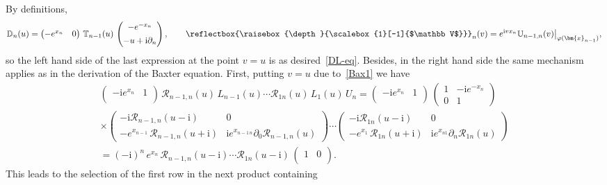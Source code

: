 \documentclass[11pt]{article}
\numberwithin{equation}{section}
\theoremstyle{plain}
\theoremstyle{definition}
\newcommand{\bbLambda}{\reflectbox{\raisebox{\depth}{\scalebox{1}[-1]{$\mathbb V$}}}}
\newcommand{\T}{\mathbb{T}}
\newcommand{\D}{\mathbb{D}}
\newcommand{\LLambda}{\bbLambda}
\newcommand{\MMO}{\mathbb{U}}
\renewcommand{\phi}{\varphi}
\renewcommand{\imath}{\mathrm{i}}
\begin{document}
By definitions, 
\begin{align}
	\D_n(u) = \begin{pmatrix}
		-e^{x_n} & 0 \\
	\end{pmatrix}\,\T_{n-1}(u)\,
	\begin{pmatrix}
		-e^{-x_n} \\[4pt] 
		-u + \imath \partial_n 
	\end{pmatrix} , \qquad \LLambda_n(v) = e^{\imath v x_n} \MMO_{n - 1, n}(v) \bigr|_{\phi(\bm{x}_{n - 1})},
\end{align}
so the left hand side of the last expression at the point $v = u$ is as desired~\eqref{DL-eq}.
Besides, in the right hand side the same mechanism applies as in the derivation of the Baxter equation. First, putting $v = u $ due to~\eqref{Bax1} we have 
\begin{multline}
\begin{pmatrix}
-\imath e^{x_n} & 1 \\
	\end{pmatrix}\,\mathcal{R}_{n-1, n}(u) \, L_{n-1}(u) \cdots 
\mathcal{R}_{1 n}(u) \, L_1(u) \,U_n = \begin{pmatrix}
-\imath e^{x_n} & 1 \\
	\end{pmatrix}\,\begin{pmatrix}
		1 & -\imath e^{-x_n} \\[4pt]
		0 & 1
	\end{pmatrix} \\[2pt] 
\times \begin{pmatrix}
-\imath\mathcal{R}_{n-1, n}(u-\imath) & 0 \\[4pt]
-e^{x_{n-1}}\,\mathcal{R}_{n-1, n}(u+\imath) & 
\imath e^{x_{n-1 \, n}}\partial_0 \mathcal{R}_{n-1, n}(u)
	\end{pmatrix}
\cdots
\begin{pmatrix}
-\imath\mathcal{R}_{1 n}(u-\imath) & 0 \\[4pt]
-e^{x_1}\,\mathcal{R}_{1 n}(u+\imath) & 
\imath e^{x_{n 1}}\partial_n \mathcal{R}_{1 n}(u)
	\end{pmatrix} \\[8pt] 
= (-\imath)^{n}\,e^{x_n}\,\mathcal{R}_{n-1, n}(u-\imath)\cdots\mathcal{R}_{1 n}(u-\imath)\,
\begin{pmatrix}
1 & 0 \\
	\end{pmatrix}.
\end{multline}
This leads to the selection of the first row in the next product containing 
\end{document}
